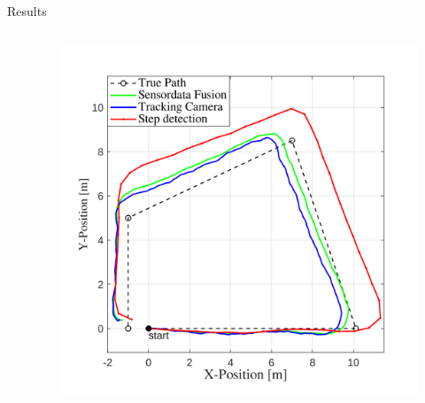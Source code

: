 \documentclass[aspectratio=169,handout]{beamer}
\begin{document}
{\begin{frame}{Results}
\begin{columns}
\begin{column}{0.45\textwidth}
			\end{column}
			\begin{column}{0.54\textwidth}
				\begin{figure}
					\centering
					\includegraphics[width=0.9\linewidth]{../Conference_Paper/Path2}
				\end{figure}
				
			\end{column}
			
			
			
		\end{columns}
	\end{frame}
	

	

}
\end{document}
